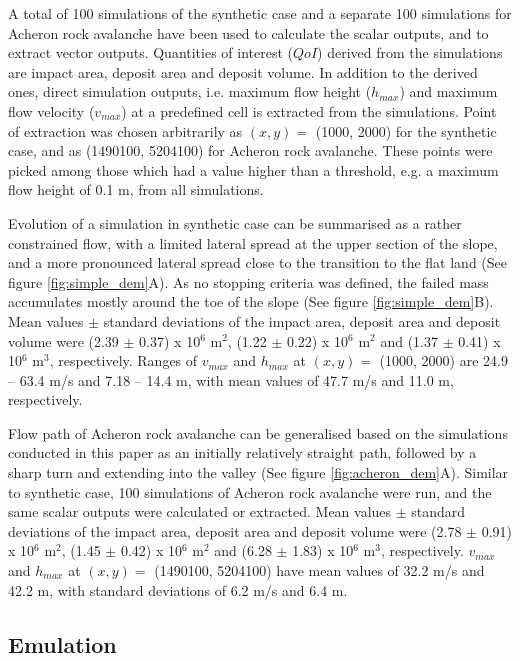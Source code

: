 \documentclass[utf8]{FrontiersinHarvard}
\begin{document}
A total of 100 simulations of the synthetic case and a separate 100 simulations for Acheron rock avalanche have been used to calculate the scalar outputs, and to extract vector outputs. Quantities of interest ($QoI$) derived from the simulations are impact area, deposit area and deposit volume. In addition to the derived ones, direct simulation outputs, i.e. maximum flow height ($h_{max}$) and maximum flow velocity ($v_{max}$) at a predefined cell is extracted from the simulations. Point of extraction was chosen arbitrarily as $\left( x, y \right) = $ (1000, 2000) for the synthetic case, and as (1490100, 5204100) for Acheron rock avalanche. These points were picked among those which had a value higher than a threshold, e.g. a maximum flow height of 0.1 m, from all simulations.

Evolution of a simulation in synthetic case can be summarised as a rather constrained flow, with a limited lateral spread at the upper section of the slope, and a more pronounced lateral spread close to the transition to the flat land (See figure \ref{fig:simple_dem}A). As no stopping criteria was defined, the failed mass accumulates mostly around the toe of the slope (See figure \ref{fig:simple_dem}B). Mean values $\pm$ standard deviations of the impact area, deposit area and deposit volume were (2.39 $\pm$ 0.37) x 10$^6$ m$^2$, (1.22 $\pm$ 0.22) x 10$^6$ m$^2$ and (1.37 $\pm$ 0.41) x 10$^6$ m$^3$, respectively. Ranges of $v_{max}$ and $h_{max}$ at $\left( x, y \right) = $ (1000, 2000) are 24.9 -- 63.4 m/s and 7.18 -- 14.4 m, with mean values of 47.7 m/s and 11.0 m, respectively. 

Flow path of Acheron rock avalanche can be generalised based on the simulations conducted in this paper as an initially relatively straight path, followed by a sharp turn and extending into the valley (See figure \ref{fig:acheron_dem}A). Similar to synthetic case, 100 simulations of Acheron rock avalanche were run, and the same scalar outputs were calculated or extracted. Mean values $\pm$ standard deviations of the impact area, deposit area and deposit volume were (2.78 $\pm$ 0.91) x 10$^6$ m$^2$, (1.45 $\pm$ 0.42) x 10$^6$ m$^2$ and (6.28 $\pm$ 1.83) x 10$^6$ m$^3$, respectively. $v_{max}$ and $h_{max}$ at $\left( x, y \right) = $ (1490100, 5204100) have mean values of 32.2 m/s and 42.2 m, with standard deviations of 6.2 m/s and 6.4 m.

\subsection{Emulation}
\label{sec:res_em}
\end{document}
